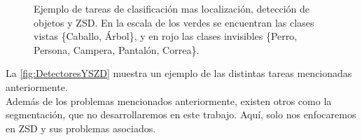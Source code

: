 \begin{figure}[]
  \centering
  \hspace{1em}%
  \caption{Ejemplo de tareas de clasificación mas localización, detección de objetos y ZSD. En la escala de los verdes se encuentran las clases vistas \{Caballo, Árbol\}, y en rojo las clases invisibles \{Perro, Persona, Campera, Pantalón, Correa\}.}
  \label{fig:DetectoresYSZD}
\end{figure}

La \autoref{fig:DetectoresYSZD} muestra un ejemplo de las distintas tareas  mencionadas anteriormente.\\

Además de los problemas mencionados anteriormente, existen otros como la segmentación, que no desarrollaremos en este trabajo. Aquí, solo nos enfocaremos en ZSD y sus problemas asociados.
 
